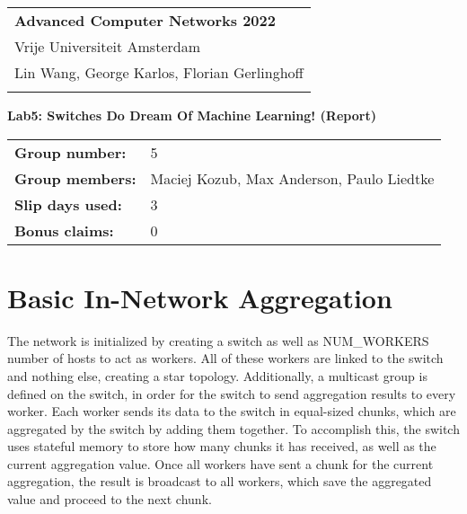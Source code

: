 \documentclass[a4paper,11pt]{article}
\begin{document}
\thispagestyle{empty} 

\begin{tabular}{@{}p{15.5cm}} 
{\bf Advanced Computer Networks 2022} \\
Vrije Universiteit Amsterdam  \\ Lin Wang, George Karlos, Florian Gerlinghoff\\
\hline 
\\
\end{tabular} 

\vspace*{0.3cm} 

{\Large \bf Lab5: Switches Do Dream Of Machine Learning! (Report)} 

\vspace*{0.3cm} 


\begin{tcolorbox}[sharp corners, colback=blue!5!white]
\begin{tabular}{@{}ll}
\textbf{Group number:} & 5 \\
\textbf{Group members:} & Maciej Kozub, Max Anderson, Paulo Liedtke \\
\textbf{Slip days used:} & 3 \\
\textbf{Bonus claims:} & 0 \\
\end{tabular}
\end{tcolorbox}

\vspace{0.4cm}

\section{Basic In-Network Aggregation}
The network is initialized by creating a switch as well as NUM\_WORKERS number of hosts to act as workers. All of these workers are linked to the switch and nothing else, creating a star topology. Additionally, a multicast group is defined on the switch, in order for the switch to send aggregation results to every worker.\newline
Each worker sends its data to the switch in equal-sized chunks, which are aggregated by the switch by adding them together. To accomplish this, the switch uses stateful memory to store how many chunks it has received, as well as the current aggregation value. Once all workers have sent a chunk for the current aggregation, the result is broadcast to all workers, which save the aggregated value and proceed to the next chunk.
\end{document}
